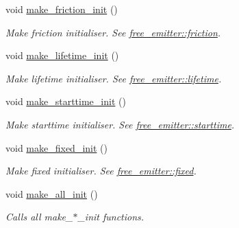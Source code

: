 \begin{DoxyCompactItemize}
void \hyperlink{classphysim_1_1emitters_1_1free__emitters_1_1multisource_ad179c7246d3fe615e327fb9866570f6f}{make\+\_\+friction\+\_\+init} ()
\begin{DoxyCompactList}\small\item\em Make friction initialiser. See \hyperlink{classphysim_1_1emitters_1_1free__emitter_a0167889dfac9483e7e2690efc353a7bd}{free\+\_\+emitter\+::friction}. \end{DoxyCompactList}\item 
void \hyperlink{classphysim_1_1emitters_1_1free__emitters_1_1multisource_a98060cb2539012355cab5179086b1535}{make\+\_\+lifetime\+\_\+init} ()
\begin{DoxyCompactList}\small\item\em Make lifetime initialiser. See \hyperlink{classphysim_1_1emitters_1_1free__emitter_a596108fe3602299fa9035ece668653d4}{free\+\_\+emitter\+::lifetime}. \end{DoxyCompactList}\item 
void \hyperlink{classphysim_1_1emitters_1_1free__emitters_1_1multisource_a2e750255e30d76c1e6ef69dec8e01d3b}{make\+\_\+starttime\+\_\+init} ()
\begin{DoxyCompactList}\small\item\em Make starttime initialiser. See \hyperlink{classphysim_1_1emitters_1_1free__emitter_af296f735438087c4acaba2242c839e49}{free\+\_\+emitter\+::starttime}. \end{DoxyCompactList}\item 
void \hyperlink{classphysim_1_1emitters_1_1free__emitters_1_1multisource_aa6fa54d4dc49b140005bf162e9b5f5b4}{make\+\_\+fixed\+\_\+init} ()
\begin{DoxyCompactList}\small\item\em Make fixed initialiser. See \hyperlink{classphysim_1_1emitters_1_1free__emitter_a2561dbe073b699e28fbb7ad10e897567}{free\+\_\+emitter\+::fixed}. \end{DoxyCompactList}\item 
\mbox{\label{classphysim_1_1emitters_1_1free__emitters_1_1multisource_ad4ba3877c01edbfb644d60344db58933}} 
void \hyperlink{classphysim_1_1emitters_1_1free__emitters_1_1multisource_ad4ba3877c01edbfb644d60344db58933}{make\+\_\+all\+\_\+init} ()
\begin{DoxyCompactList}\small\item\em Calls all make\+\_\+$\ast$\+\_\+init functions. \end{DoxyCompactList}\item 

\end{DoxyCompactItemize}
